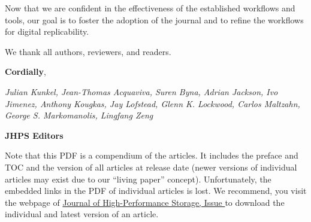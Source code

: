 \documentclass{jhps}
\begin{document}
\medskip

Now that we are confident in the effectiveness of the established workflows and tools, our goal is to foster the adoption of the journal and to refine the workflows for digital replicability.

\medskip

We thank all authors, reviewers, and readers.

\bigskip

\setlength\parindent{0pt}

\textbf{Cordially},

\textit{Julian Kunkel, Jean-Thomas Acquaviva, Suren Byna, Adrian Jackson, Ivo Jimenez, Anthony Kougkas, Jay Lofstead, Glenn K. Lockwood, Carlos Maltzahn, George S. Markomanolis, Lingfang Zeng}

\textbf{JHPS Editors}

\newpage

Note that this PDF is a compendium of the articles. 
It includes the preface and TOC and the version of all articles at release date (newer versions of individual articles may exist due to our “living paper” concept).
Unfortunately, the embedded links in the PDF of individual articles is lost. 
We recommend, you visit the webpage of 
\href{https://jhps.vi4io.org/issue/\the\JHPSissue}{Journal of High-Performance Storage, Issue \the\JHPSissue} to  download the individual and latest version of an article.

\tableofcontents

\label{LastPage}


\newpage 
\clearpage
\pagestyle{empty}

{}

\end{document}

